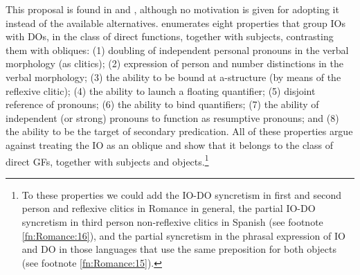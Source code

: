 \documentclass[output=paper,hidelinks]{langscibook}
\begin{document}
 This proposal is found in \citet{Schwarze2001} and \citet[185--194]{Sells2013}, although no motivation is given for adopting it instead of the available alternatives. \citet[150--160]{alsina1996the-role}  enumerates eight properties that group IOs with DOs, in the class of direct functions, together with subjects, contrasting them with obliques: (1) doubling of independent personal pronouns in the verbal morphology (as clitics); (2) expression of person and number distinctions in the verbal morphology; (3) the ability to be bound at a-structure (by means of the reflexive clitic); (4) the ability to launch a floating quantifier; (5) disjoint reference of pronouns; (6) the ability to bind quantifiers; (7) the ability of independent (or strong) pronouns to function as resumptive pronouns; and (8) the ability to be the target of secondary predication. All of these properties argue against treating the IO as an oblique and show that it belongs to the class of direct GFs, together with subjects and objects.\footnote{To these properties we could add the IO-DO syncretism in first and second person and reflexive clitics in Romance in general, the partial IO-DO syncretism in third person non-reflexive clitics in Spanish (see footnote \ref{fn:Romance:16}), and the partial syncretism in the phrasal expression of IO and DO in those languages that use the same preposition for both objects (see footnote \ref{fn:Romance:15}).}
\end{document}

